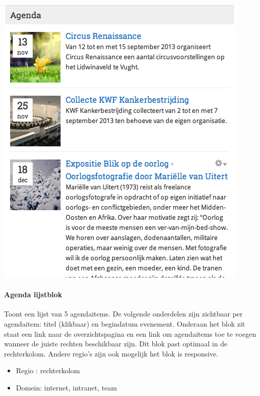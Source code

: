 \begin{center}
	\includegraphics[scale=0.5]{img/blokken/agendateaser.png}
\end{center}

\paragraph{Agenda lijstblok}

Toont een lijst van 5 agendaitems. De volgende onderdelen zijn zichtbaar per agendaitem: titel (klikbaar) en begindatum evenement. Onderaan het blok zit staat een link naar de overzichtspagina en een link om agendaitems toe te voegen wanneer de juiste rechten beschikbaar zijn. Dit blok past optimaal in de rechterkolom. Andere regio's zijn ook mogelijk het blok is responsive.

\begin{itemize}
\item Regio : rechterkolom
\item Domein: internet, intranet, team
\end{itemize}

